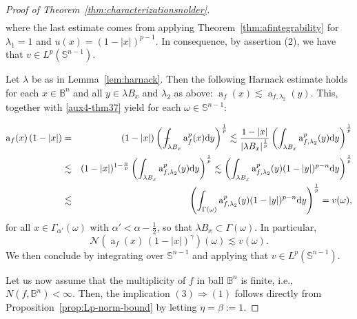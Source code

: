 \documentclass[11pt,a4paper,reqno]{amsart}
\theoremstyle{definition}
\def\vint{\mathop{\mathchoice%
          {\setbox0\hbox{$\displaystyle\intop$}\kern 0.22\wd0%
           \vcenter{\hrule width 0.6\wd0}\kern -0.82\wd0}%
          {\setbox0\hbox{$\textstyle\intop$}\kern 0.2\wd0%
           \vcenter{\hrule width 0.6\wd0}\kern -0.8\wd0}%
          {\setbox0\hbox{$\scriptstyle\intop$}\kern 0.2\wd0%
           \vcenter{\hrule width 0.6\wd0}\kern -0.8\wd0}%
          {\setbox0\hbox{$\scriptscriptstyle\intop$}\kern 0.2\wd0%
           \vcenter{\hrule width 0.6\wd0}\kern -0.8\wd0}}%
          \mathopen{}\int}
\renewcommand{\a}{\operatorname{a}}
\newcommand{\ep}{\epsilon}
\newcommand{\om}{\omega}
\newcommand{\B}{\mathbb{B}^n}
\newcommand{\Nm}{\mathcal{N}}
\newcommand{\ud}{\mathrm {d}}
\newcommand{\Sn}{\mathbb{S}^{n-1}}
\numberwithin{komcounter}{section}
\begin{document}
\begin{proof}[Proof of Theorem~\ref{thm:characterizationsnolder}]
\begin{eqnarray*}
\end{eqnarray*}
where the last estimate comes from applying Theorem~\ref{thm:afintegrability} for $\lambda_1=1$ and $u(x)=(1-|x|)^{p-1}$. In consequence, by assertion (2), we have that $v\in L^p(\Sn)$.

Let $\lambda$ be as in Lemma~\ref{lem:harnack}. Then the following Harnack estimate holds for each $x\in \B$ and all $y\in\lambda B_x$ and $\lambda_2$ as above: $\a_f(x)\lesssim \a_{f,\lambda_2}(y)$. This, together with \eqref{aux4-thm37} yield for each $\omega\in\Sn$:

\begin{eqnarray}
\a_{f}(x)\, (1-|x|) &=&(1-|x|) \left(\vint_{\lambda B_x}\a_f^p(x)\ud y\right)^\frac{1}{p} \lesssim \frac{1-|x|}{|\lambda B_x|^\frac{1}{p}} \left(\int_{\lambda B_x}\a^p_{f,\lambda_2}(y)\ud y\right)^\frac{1}{p} \nonumber \\
&\lesssim & (1-|x|)^{1 -\frac{n}{p}} \left(\int_{\lambda B_x}\a^p_{f,\lambda_2}(y) \ud y\right)^\frac{1}{p} \lesssim
\left(\int_{\lambda B_x}\a^p_{f,\lambda_2}(y)(1-|y|)^{p-n} \ud y\right)^\frac{1}{p} \nonumber \\
&\lesssim & \left(\int_{\Gamma (\omega )}\a^p_{f,\lambda_2}(y) (1-|y|)^{p-n} \ud y\right)^\frac{1}{p} =v(\om), \label{aux8-lem37}
\end{eqnarray}
for all $x\in \Gamma_{\alpha'} (\omega )$ with $\alpha'<\alpha-\frac12$, so that $\lambda B_x\subset \Gamma(\om)$. In particular,
$$
 \Nm(\a_{f}(x)\, (1-|x|)^\gamma  )(\omega )\lesssim v(\omega ).
$$
We then conclude by integrating over $\Sn$ and applying that $v\in L^p(\Sn )$.

% 
\smallskip
	 
\noindent Let us now assume that the multiplicity of $f$ in ball $\B$ is finite, i.e., ${N(f,\B)<\infty}$. Then, the implication  $(3)\Rightarrow (1)$ follows directly from Proposition~\ref{prop:Lp-norm-bound} by letting $\eta=\beta:=1$.


\end{proof}
\end{document}
